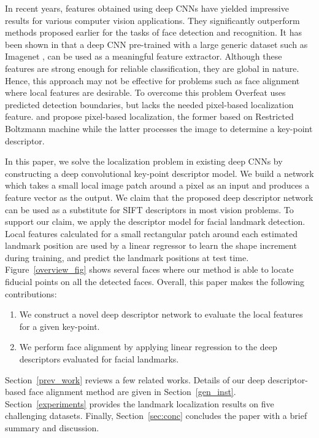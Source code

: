 \documentclass[10pt,twocolumn,letterpaper]{article}
\begin{document}
In recent years, features obtained using deep CNNs have yielded impressive results for various computer vision applications. They significantly outperform methods proposed earlier for the tasks of face detection and recognition. It has been shown in \cite{NIPS2012_4824} that a deep CNN pre-trained with a large generic dataset such as Imagenet \cite{ILSVRC15}, can be used as a meaningful feature extractor. Although these features are strong enough for reliable classification, they are global in nature. Hence, this approach may not be effective for problems such as face alignment where local features are desirable. To overcome this problem Overfeat \cite{sermanet-iclr-14}  uses predicted detection boundaries, but  lacks the needed pixel-based localization feature. \cite{Taylor:2010:CLS:1888212.1888225} and \cite{10.1109/TPAMI.2012.231} propose pixel-based localization, the former based on Restricted Boltzmann machine while the latter processes the image to determine a key-point descriptor.

In this paper, we solve the localization problem in existing deep CNNs by constructing a deep convolutional key-point descriptor model. We build a network which takes a small local image patch around a pixel as an input and produces a feature vector as the output. We claim that the proposed deep descriptor network can be used as a substitute for SIFT \cite{Lowe04distinctiveimage} descriptors in most vision problems. To support our claim, we apply the descriptor model for facial landmark detection. Local features calculated for a small rectangular patch around each estimated landmark position are used by a linear regressor to learn the shape increment during training, and predict the landmark positions at test time. Figure~\ref{overview_fig} shows several faces where our method is able to locate fiducial points on all the detected faces.  Overall, this paper makes the following contributions:
\begin{enumerate}
\item We construct a novel deep descriptor network to evaluate the local features for a given key-point.
\item We perform face alignment by applying linear regression to the deep descriptors evaluated for facial landmarks.
\end{enumerate}




 Section~\ref{prev_work} reviews a few related works.  Details of our deep descriptor-based face alignment method are given in Section~\ref{gen_inst}.  Section~\ref{experiments} provides the landmark localization results on five challenging datasets. Finally, Section~\ref{sec:conc} concludes the paper with a brief summary and discussion.
\end{document}
